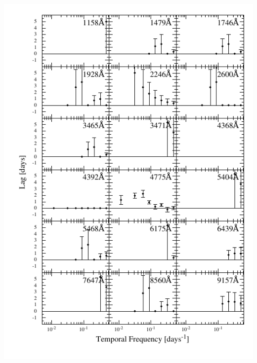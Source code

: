 \documentclass[11pt,letterpaper]{article}
\begin{document}
\includegraphics{../img/timelag_atlas_err1.pdf}
\end{document}
